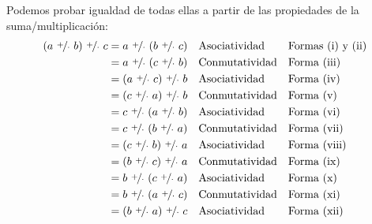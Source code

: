 \documentclass[11pt]{article}
\begin{document}
Podemos probar igualdad de todas ellas a partir de las propiedades de la suma/multiplicación:
\vspace{1em}\begin{align*}
    (a \ \nicefrac{+}{\cdot} \ b) \ \nicefrac{+}{\cdot} \ c &= a \ \nicefrac{+}{\cdot} \ (b \ \nicefrac{+}{\cdot} \ c) && \text{Asociatividad} && \text{Formas (i) y (ii)}\\
    &= a \ \nicefrac{+}{\cdot} \ (c \ \nicefrac{+}{\cdot} \ b) && \text{Conmutatividad} && \text{Forma (iii)}\\
    &= (a \ \nicefrac{+}{\cdot} \ c) \ \nicefrac{+}{\cdot} \ b && \text{Asociatividad} && \text{Forma (iv)}\\
    &= (c \ \nicefrac{+}{\cdot} \ a) \ \nicefrac{+}{\cdot} \ b && \text{Conmutatividad}&& \text{Forma (v)}\\
    &= c \ \nicefrac{+}{\cdot} \ (a \ \nicefrac{+}{\cdot} \ b) && \text{Asociatividad}&& \text{Forma (vi)}\\
    &= c \ \nicefrac{+}{\cdot} \ (b \ \nicefrac{+}{\cdot} \ a) && \text{Conmutatividad}&& \text{Forma (vii)}\\
    &= (c \ \nicefrac{+}{\cdot} \ b) \ \nicefrac{+}{\cdot} \ a && \text{Asociatividad}&& \text{Forma (viii)}\\
    &= (b \ \nicefrac{+}{\cdot} \ c) \ \nicefrac{+}{\cdot} \ a && \text{Conmutatividad}&& \text{Forma (ix)}\\
    &= b \ \nicefrac{+}{\cdot} \ (c \ \nicefrac{+}{\cdot} \ a) && \text{Asociatividad}&& \text{Forma (x)}\\
    &= b \ \nicefrac{+}{\cdot} \ (a \ \nicefrac{+}{\cdot} \ c) && \text{Conmutatividad}&& \text{Forma (xi)}\\
    &= (b \ \nicefrac{+}{\cdot} \ a) \ \nicefrac{+}{\cdot} \ c && \text{Asociatividad}&& \text{Forma (xii)}
\end{align*}
%
\end{document}
